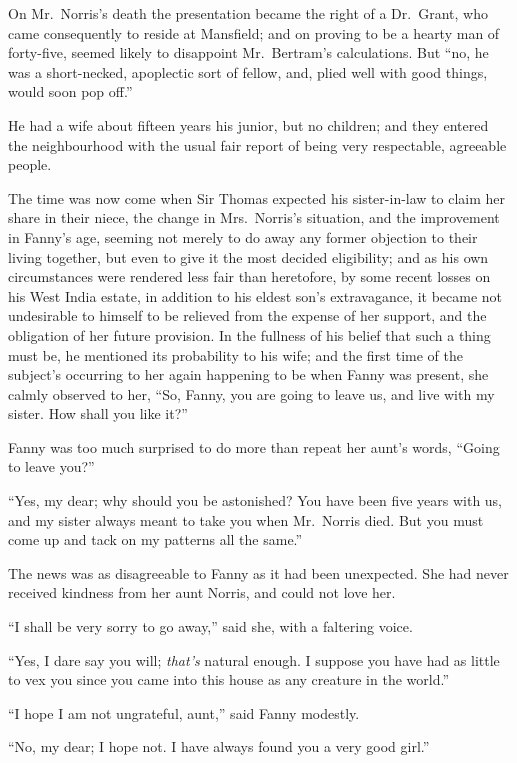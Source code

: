 On Mr.\ Norris's death the presentation became the right of
a Dr.\ Grant, who came consequently to reside at Mansfield;
and on proving to be a hearty man of forty-five, seemed
likely to disappoint Mr.\ Bertram's calculations.
But ``no, he was a short-necked, apoplectic sort of fellow,
and, plied well with good things, would soon pop off.''

He had a wife about fifteen years his junior, but no children;
and they entered the neighbourhood with the usual fair
report of being very respectable, agreeable people.

The time was now come when Sir Thomas expected his
sister-in-law to claim her share in their niece,
the change in Mrs.\ Norris's situation, and the improvement
in Fanny's age, seeming not merely to do away any former
objection to their living together, but even to give it
the most decided eligibility; and as his own circumstances
were rendered less fair than heretofore, by some recent
losses on his West India estate, in addition to his eldest
son's extravagance, it became not undesirable to himself to be
relieved from the expense of her support, and the obligation
of her future provision.  In the fullness of his belief
that such a thing must be, he mentioned its probability
to his wife; and the first time of the subject's occurring
to her again happening to be when Fanny was present,
she calmly observed to her, ``So, Fanny, you are going
to leave us, and live with my sister.  How shall you like it?''

Fanny was too much surprised to do more than repeat
her aunt's words, ``Going to leave you?''

``Yes, my dear; why should you be astonished?
You have been five years with us, and my sister
always meant to take you when Mr.\ Norris died.
But you must come up and tack on my patterns all the same.''

The news was as disagreeable to Fanny as it had been unexpected.
She had never received kindness from her aunt Norris,
and could not love her.

``I shall be very sorry to go away,'' said she, with a
faltering voice.

``Yes, I dare say you will; \emph{that's} natural enough.
I suppose you have had as little to vex you since you came
into this house as any creature in the world.''

``I hope I am not ungrateful, aunt,'' said Fanny modestly.

``No, my dear; I hope not.  I have always found you
a very good girl.''

